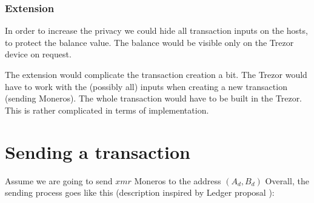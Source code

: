 \documentclass[]{article}
\begin{document}
\subsubsection{Extension} In order to increase the privacy we could hide all transaction inputs on the hosts, to protect the balance value. The balance would be visible only on the Trezor device on request.

The extension would complicate the transaction creation a bit. The Trezor would have to work with the (possibly all) inputs when creating a new transaction (sending Moneros). The whole transaction would have to be built in the Trezor. This is rather complicated in terms of implementation. 


\section{Sending a transaction}
Assume we are going to send $xmr$ Moneros to the address $(A_d, B_d)$
Overall, the sending process goes like this (description inspired by Ledger proposal \cite{ledger_doc}):
\end{document}
